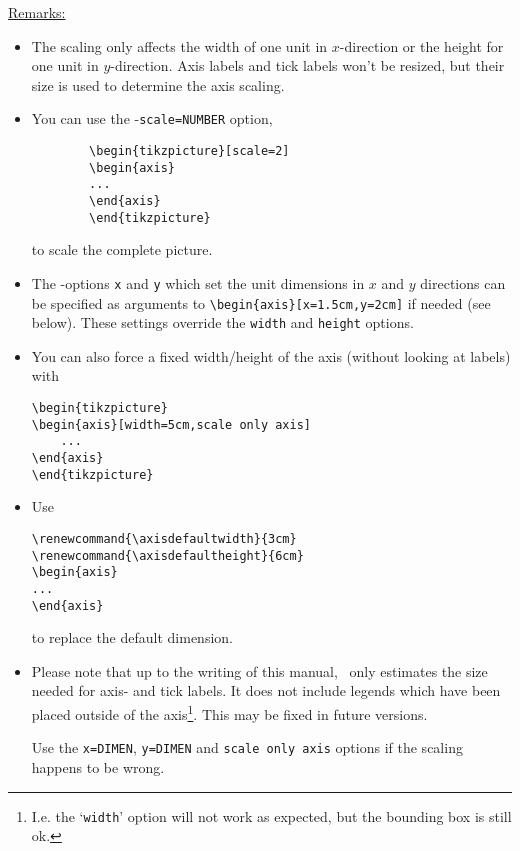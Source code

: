 \noindent\underline{Remarks:} 
\begin{itemize}
	\item The scaling only affects the width of one unit in $x$-direction or the height for one unit in $y$-direction. Axis labels and tick labels won't be resized, but their size is used to determine the axis scaling.

	\item You can use the \Tikz-\lstinline!scale=NUMBER! option,
	\begin{lstlisting}
		\begin{tikzpicture}[scale=2]
		\begin{axis}
		...
		\end{axis}
		\end{tikzpicture}
	\end{lstlisting}
	to scale the complete picture.

	\item The \Tikz-options \lstinline!x! and \lstinline!y! which set the unit dimensions in $x$ and $y$ directions can be specified as arguments to \lstinline!\begin{axis}[x=1.5cm,y=2cm]! if needed (see below). These settings override the \lstinline!width! and \lstinline!height! options.

	\item You can also force a fixed width/height of the axis (without looking at labels) with
	\begin{lstlisting}
\begin{tikzpicture}
\begin{axis}[width=5cm,scale only axis]
	...
\end{axis}
\end{tikzpicture}
	\end{lstlisting}

	\item Use
	\begin{lstlisting}
\renewcommand{\axisdefaultwidth}{3cm}
\renewcommand{\axisdefaultheight}{6cm}
\begin{axis}
...
\end{axis}
	\end{lstlisting}
	to replace the default dimension.

	\item Please note that up to the writing of this manual, \PGFPlots\ only estimates the size needed for axis- and tick labels. It does not include legends which have been placed outside of the axis\footnote{I.e. the `\texttt{width}' option will not work as expected, but the bounding box is still ok.}. This may be fixed in future versions.

	Use the \lstinline!x=DIMEN!, \lstinline!y=DIMEN! and \lstinline!scale only axis! options if the scaling happens to be wrong.
\end{itemize}


